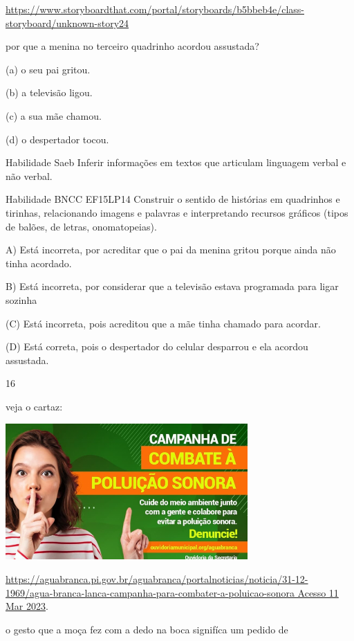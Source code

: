 {{{{{{\url{https://www.storyboardthat.com/portal/storyboards/b5bbeb4e/class-storyboard/unknown-story24}

por que a menina no terceiro quadrinho acordou assustada?

(a) o seu pai gritou.

(b) a televisão ligou.

(c) a sua mãe chamou.

(d) o despertador tocou.

\protect\hypertarget{_Hlk129586447}{}{}Habilidade Saeb Inferir
informações em textos que articulam linguagem verbal e não verbal.

Habilidade BNCC EF15LP14 Construir o sentido de histórias em quadrinhos
e tirinhas, relacionando imagens e palavras e interpretando recursos
gráficos (tipos de balões, de letras, onomatopeias).

A) Está incorreta, por acreditar que o pai da menina gritou porque ainda
não tinha acordado.

B) Está incorreta, por considerar que a televisão estava programada para
ligar sozinha

(C) Está incorreta, pois acreditou que a mãe tinha chamado para acordar.

(D) Está correta, pois o despertador do celular desparrou e ela acordou
assustada.

\num{16}

veja o cartaz:

\includegraphics[width=3.64744in,height=2.05233in]{media/image173.png}

\href{https://aguabranca.pi.gov.br/aguabranca/portalnoticias/noticia/31-12-1969/agua-branca-lanca-campanha-para-combater-a-poluicao-sonora\%20Acesso\%2011\%20Mar\%202023}{https://aguabranca.pi.gov.br/aguabranca/portalnoticias/noticia/31-12-1969/agua-branca-lanca-campanha-para-combater-a-poluicao-sonora
Acesso 11 Mar 2023}.

o gesto que a moça fez com a dedo na boca signifíca um pedido de

}}}}}}

